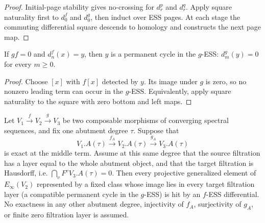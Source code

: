 \begin{proof}
  Initial-page stability gives no-crossing for $d_r^p$ and $d_r^q$.  Apply
  square naturality first to $d_0^f$ and $d_0^g$, then induct over ESS pages.
  At each stage the commuting differential square descends to homology and
  constructs the next page map.
\end{proof}

\begin{corollary}
  \label{cor:fess-zero-composite-permanent}
  \notready
  If $gf=0$ and $d_n^f(x)=y$, then $y$ is a permanent cycle in the $g$-ESS:
  $d_m^g(y)=0$ for every $m\ge0$.
\end{corollary}

\begin{proof}
  Choose $[x]$ with $f[x]$ detected by $y$.  Its image under $g$ is zero, so
  no nonzero leading term can occur in the $g$-ESS.  Equivalently, apply square
  naturality to the square with zero bottom and left maps.
\end{proof}

\begin{proposition}
  \label{prop:fess-exact-middle-boundary}
  \notready
  Let $V_1\xrightarrow{f}V_2\xrightarrow{g}V_3$ be two composable morphisms of
  converging spectral sequences, and fix one abutment degree $\tau$.  Suppose
  that
  \[
    V_1.A(\tau)\xrightarrow{f_A}V_2.A(\tau)
      \xrightarrow{g_A}V_3.A(\tau)
  \]
  is exact at the middle term.  Assume at this same degree that the source
  filtration has a layer equal to the whole abutment object, and that the
  target filtration is Hausdorff, i.e.
  $\bigcap_v F^vV_3.A(\tau)=0$.  Then every projective generalized element of
  $E_\infty(V_2)$ represented by a fixed class whose image lies in every
  target filtration layer (a compatible permanent cycle in the $g$-ESS) is
  hit by an $f$-ESS differential.  No exactness in any other abutment degree,
  injectivity of $f_A$, surjectivity of $g_A$, or finite zero filtration layer
  is assumed.
\end{proposition}

